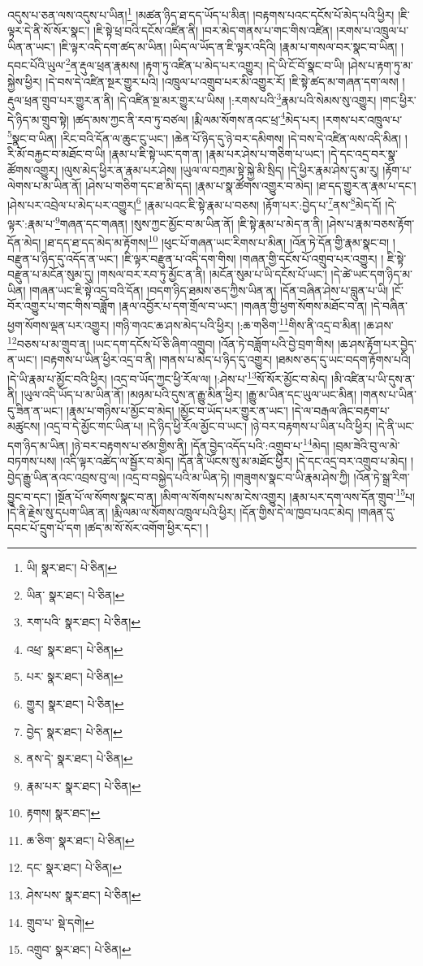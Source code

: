 འདུས་པ་ཅན་ལས་འདུས་པ་ཡིན།\footnote{ཡི།  སྣར་ཐང་།  པེ་ཅིན། } །མཚན་ཉིད་ཐ་དད་ཡོད་པ་མིན། །བརྟགས་པའང་དངོས་པོ་མེད་པའི་ཕྱིར། །ཇི་ལྟར་དེ་ནི་སོ་སོར་སྣང་། །ཇི་སྟེ་ཕྲ་བའི་དངོས་འཛིན་ནི། །བར་མེད་གནས་པ་གང་གིས་འཛིན། །རགས་པ་འཁྲུལ་པ་ཡིན་ན་ཡང་། །ཇི་ལྟར་འདི་དག་ཚད་མ་ཡིན། །ཡིད་ལ་ཡོད་ན་ཇི་ལྟར་འདིའི། །རྣམ་པ་གསལ་བར་སྣང་བ་ཡིན། །དབང་པོའི་ཡུལ་\footnote{ཡིན་  སྣར་ཐང་།  པེ་ཅིན། }ན་རྡུལ་ཕྲན་རྣམས། །རྟག་ཏུ་འཛིན་པ་མེད་པར་འགྱུར། །དེ་ཡི་ངོ་བོ་སྣང་བ་ཡི། །ཤེས་པ་རྟག་ཏུ་མ་སྐྱེས་ཕྱིར། །དེ་བས་དེ་འཛིན་སྔར་གྱུར་པའི། །འཁྲུལ་པ་འགྲུབ་པར་མི་འགྱུར་རོ། །ཇི་སྟེ་ཚད་མ་གཞན་དག་ལས། །རྡུལ་ཕྲན་གྲུབ་པར་གྱུར་ན་ནི། །དེ་འཛིན་སྔ་མར་གྱུར་པ་ཡིས། །:རགས་པའི་\footnote{རག་པའི་  སྣར་ཐང་།  པེ་ཅིན། }རྣམ་པའི་སེམས་སུ་འགྱུར། །གང་ཕྱིར་དེ་ཉིད་མ་གྲུབ་སྟེ། །ཚད་མས་ཀྱང་ནི་རབ་ཏུ་བཙལ། །རྨི་ལམ་སོགས་ནའང་ཕྲ་\footnote{འཕྲ་  སྣར་ཐང་།  པེ་ཅིན། }མེད་པར། །རགས་པར་འཁྲུལ་པ་\footnote{པར་  སྣར་ཐང་།  པེ་ཅིན། }སྣང་བ་ཡིན། །རིང་བའི་དོན་ལ་ཆུང་ངུ་ཡང་། །ཆེན་པོ་ཉིད་དུ་ཉེ་བར་དམིགས། །དེ་བས་དེ་འཛིན་ལས་འདི་མིན། །རི་མོ་བརྐྱང་བ་མཐོང་བ་ཡི། །རྣམ་པ་ཇི་སྟེ་ཡང་དག་ན། །རྣམ་པར་ཤེས་པ་གཅིག་པ་ཡང་། །དེ་དང་འདྲ་བར་སྣ་ཚོགས་འགྱུར། །ལུས་མེད་ཕྱིར་ན་རྣམ་པར་ཤེས། །ཡུལ་ལ་བཀྲམ་སྟེ་སྐྱེ་མི་སྲིད། །དེ་ཕྱིར་རྣམ་ཤེས་དུ་མ་རུ། །རྟོག་པ་ལེགས་པ་མ་ཡིན་ནོ། །ཤེས་པ་གཅིག་དང་ཐ་མི་དད། །རྣམ་པ་སྣ་ཚོགས་འགྱུར་བ་མེད། །ཐ་དད་གྱུར་ན་རྣམ་པ་དང་། །ཤེས་པར་འབྲེལ་པ་མེད་པར་འགྱུར།\footnote{གྱུར།  སྣར་ཐང་།  པེ་ཅིན། } །རྣམ་པའང་ཇི་སྟེ་རྣམ་པ་བཅས། །རྟོག་པར་:བྱེད་པ་\footnote{བྱེད་  སྣར་ཐང་།  པེ་ཅིན། }ནས་\footnote{ནས་དེ་  སྣར་ཐང་།  པེ་ཅིན། }མེད་དོ། །དེ་ལྟར་:རྣམ་པ་\footnote{རྣམ་པར་  སྣར་ཐང་།  པེ་ཅིན། }གཞན་དང་གཞན། །སུས་ཀྱང་མྱོང་བ་མ་ཡིན་ནོ། །ཇི་སྟེ་རྣམ་པ་མེད་ན་ནི། །ཤེས་པ་རྣམ་བཅས་རྟོག་དོན་མེད། །ཐ་དད་ཐ་དད་མེད་མ་རྟོགས།\footnote{རྟགས།  སྣར་ཐང་། } །ཕུང་པོ་གཞན་ཡང་རིགས་པ་མིན། །འོན་ཏེ་དོན་གྱི་རྣམ་སྣང་བ། །བརྫུན་པ་ཉིད་དུ་འདོད་ན་ཡང་། །ཇི་ལྟར་བརྫུན་པ་འདི་དག་གིས། །གཞན་གྱི་དངོས་པོ་འགྲུབ་པར་འགྱུར། །
ཇི་སྟེ་བརྫུན་པ་མངོན་སུམ་དུ། །གསལ་བར་རབ་ཏུ་མྱོང་ན་ནི། །མངོན་སུམ་པ་ཡི་དངོས་པོ་ཡང་། །དེ་ཚེ་ཡང་དག་ཉིད་མ་ཡིན། །གཞན་ཡང་ཇི་སྟེ་འདྲ་བའི་དོན། །བདག་ཉིད་ཐམས་ཅད་ཀྱིས་ཡིན་ན། །དོན་བཞིན་ཤེས་པ་བླུན་པ་ཡི། །ངོ་བོར་འགྱུར་པ་གང་གིས་བཟློག །རྣལ་འབྱོར་པ་དག་གྲོལ་བ་ཡང་། །གཞན་གྱི་ཕྱག་སོགས་མཐོང་བ་ན། །དེ་བཞིན་ཕྱག་སོགས་ལྡན་པར་འགྱུར། །གཉི་གའང་ཆ་ཤས་མེད་པའི་ཕྱིར། །:ཆ་གཅིག་\footnote{ཆ་ཅིག་  སྣར་ཐང་།  པེ་ཅིན། }གིས་ནི་འདྲ་བ་མིན། །ཆ་ཤས་\footnote{དང་  སྣར་ཐང་།  པེ་ཅིན། }བཅས་པ་མ་གྲུབ་ན། །ཡང་དག་དངོས་པོ་ཅི་ཞིག་འགྲུབ། །འོན་ཏེ་བཟློག་པའི་བྱེ་བྲག་གིས། །ཆ་ཤས་རྟོག་པར་བྱེད་ན་ཡང་། །བརྟགས་པ་ཡིན་ཕྱིར་འདྲ་བ་ནི། །གནས་པ་མེད་པ་ཉིད་དུ་འགྱུར། །ཐམས་ཅད་དུ་ཡང་བདག་རྟོགས་པའི། །དེ་ཡི་རྣམ་པ་མྱོང་བའི་ཕྱིར། །འདྲ་བ་ཡོད་ཀྱང་ཕྱི་རོལ་ལ། །:ཤེས་པ་\footnote{ཤེས་པས་  སྣར་ཐང་།  པེ་ཅིན། }སོ་སོར་མྱོང་བ་མེད། །མི་འཛིན་པ་ཡི་དུས་ན་ནི། །ཡུལ་འདི་ཡོད་པ་མ་ཡིན་ནོ། །མཉམ་པའི་དུས་ན་རྒྱུ་མིན་ཕྱིར། །རྒྱུ་མ་ཡིན་དང་ཡུལ་ཡང་མིན། །གནས་པ་ཡིན་དུ་ཟིན་ན་ཡང་། །རྣམ་པ་གཉིས་པ་མྱོང་བ་མེད། །མྱོང་བ་ཡོད་པར་གྱུར་ན་ཡང་། །དེ་ལ་བརྒལ་ཞིང་བརྟག་པ་མཚུངས། །འདྲ་བ་དེ་མྱོང་གང་ཡིན་པ། །དེ་ཉིད་ཕྱི་རོལ་མྱོང་བ་ཡང་། །ཉེ་བར་བརྟགས་པ་ཡིན་པའི་ཕྱིར། །དེ་ནི་ཡང་དག་ཉིད་མ་ཡིན། །ཉེ་བར་བརྟགས་པ་ཙམ་གྱིས་ནི། །དོན་བྱེད་འདོད་པའི་:འགྲུབ་པ་\footnote{གྲུབ་པ་  སྡེ་དགེ། }མེད། །བྲམ་ཟེའི་བུ་ལ་མེ་བཏགས་པས། །འདི་ལྟར་འཚེད་ལ་སྦྱོར་བ་མེད། །དོན་ནི་ཡོངས་སུ་མ་མཐོང་ཕྱིར། །དེ་དང་འདྲ་བར་འགྲུབ་པ་མེད། །བྱེད་རྒྱུ་ཡིན་ནའང་འབྲས་བུ་ལ། །འདྲ་བ་བསྐྱེད་པའི་མ་ཡིན་ཏེ། །གཟུགས་སྣང་བ་ཡི་རྣམ་ཤེས་ཀྱི། །འོན་ཏེ་སྒྲ་རིག་བྱུང་བ་དང་། །སྔོན་པོ་ལ་སོགས་སྣང་བ་ན། །མིག་ལ་སོགས་པས་མ་ངེས་འགྱུར། །རྣམ་པར་དག་ལས་དོན་གྲུབ་\footnote{འགྲུབ་  སྣར་ཐང་།  པེ་ཅིན། }པ། །དེ་ནི་རྗེས་སུ་དཔག་ཡིན་ན། །རྨི་ལམ་ལ་སོགས་འཁྲུལ་པའི་ཕྱིར། །དོན་གྱིས་དེ་ལ་ཁྱབ་པའང་མེད། །གཞན་དུ་དབང་པོ་དྲུག་པོ་དག །ཚད་མ་སོ་སོར་འགོག་ཕྱིར་དང་། །
